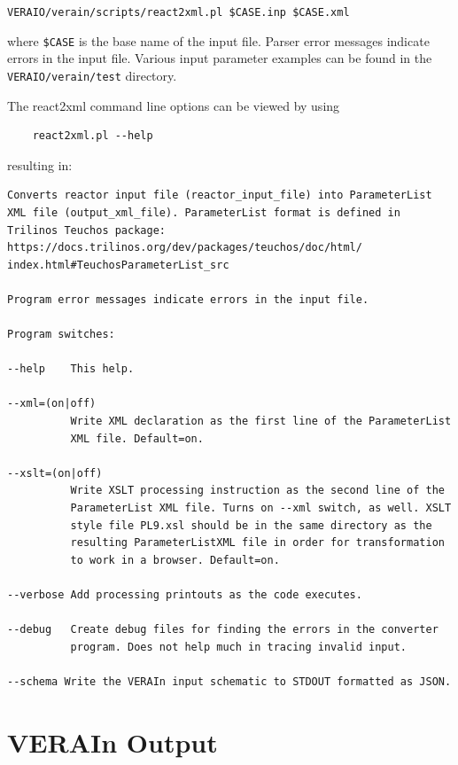 \documentclass{vera-ornltm}
\begin{document}
\texttt{VERAIO/verain/scripts/react2xml.pl \$CASE.inp \$CASE.xml}

where \texttt{\$CASE} is the base name of the input file. 
Parser error messages indicate errors in the input file. 
Various input parameter examples can be found in the \texttt{VERAIO/verain/test} directory.

The react2xml command line options can be viewed by using

\begin{verbatim}
    react2xml.pl --help
\end{verbatim}

resulting in:

\begin{verbatim}
Converts reactor input file (reactor_input_file) into ParameterList
XML file (output_xml_file). ParameterList format is defined in
Trilinos Teuchos package: https://docs.trilinos.org/dev/packages/teuchos/doc/html/
index.html#TeuchosParameterList_src

Program error messages indicate errors in the input file.

Program switches:

--help    This help.

--xml=(on|off)
          Write XML declaration as the first line of the ParameterList
          XML file. Default=on.

--xslt=(on|off)
          Write XSLT processing instruction as the second line of the
          ParameterList XML file. Turns on --xml switch, as well. XSLT
          style file PL9.xsl should be in the same directory as the
          resulting ParameterListXML file in order for transformation
          to work in a browser. Default=on.

--verbose Add processing printouts as the code executes.

--debug   Create debug files for finding the errors in the converter
          program. Does not help much in tracing invalid input.

--schema Write the VERAIn input schematic to STDOUT formatted as JSON.
\end{verbatim}


\section{VERAIn Output}
\end{document}
